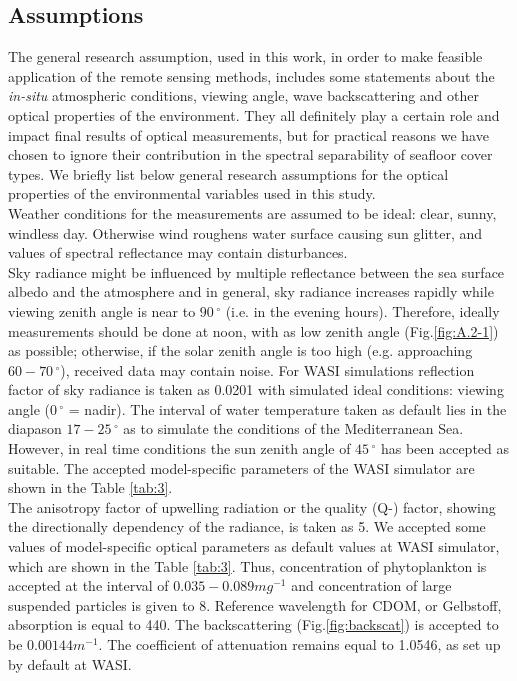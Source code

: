 \documentclass[11pt]{article}
\begin{document}
\subsection{Assumptions}
The general research assumption, used in this work, in order to make feasible application of the remote sensing methods, includes some statements about the \textit{in-situ} atmospheric conditions, viewing angle, wave backscattering and other optical properties of the environment. They all definitely play a certain role and impact final results of optical measurements, but for practical reasons we have chosen to ignore their contribution in the spectral separability of seafloor cover types. We briefly list below general research assumptions for the optical properties of the environmental variables used in this study. \vspace{1ex}\\
Weather conditions for the measurements are assumed to be ideal: clear, sunny, windless day. Otherwise wind roughens water surface causing sun glitter, and values of spectral reflectance may contain disturbances. \\ Sky radiance might be influenced by multiple reflectance between the sea surface albedo and the atmosphere and in general, sky radiance increases rapidly while viewing zenith angle is near to $90\,^{\circ}$ (i.e. in the evening hours). Therefore, ideally measurements should be done at noon, with as low zenith angle (Fig.\ref{fig:A.2-1})\label{zenith} as possible; otherwise, if the solar zenith angle is too high (e.g. approaching $60-70\,^{\circ}$), received data may contain noise. For \ac{WASI} simulations reflection factor of sky radiance is taken as 0.0201 with simulated ideal conditions: viewing angle ($0\,^{\circ}$ = nadir). The interval of water temperature taken as default lies in the diapason $17-25\,^{\circ}$ as to simulate the conditions of the Mediterranean Sea. However, in real time conditions the sun zenith angle of $45\,^{\circ}$ has been accepted as suitable. 
The accepted model-specific parameters of the \ac{WASI} simulator are shown in the Table \ref{tab:3}.\label{page-10} \vspace{1ex}\\
The anisotropy factor of upwelling radiation or the quality (Q-) factor, showing the directionally dependency of the radiance, is taken as 5. We accepted some values of model-specific optical parameters as default values at \ac{WASI} simulator, which are shown in the Table \ref{tab:3}. Thus, concentration of phytoplankton is accepted at the interval of $0.035-0.089 mg^{-1}$ and concentration of large suspended particles is given to 8. Reference wavelength for \ac{CDOM}, or Gelbstoff, absorption is equal to 440. The backscattering (Fig.\ref{fig:backscat}) is accepted to be $0.00144m^{-1}$. The coefficient of attenuation remains equal to 1.0546, as set up by default at \ac{WASI}.\vspace{1ex}\\
\end{document}
